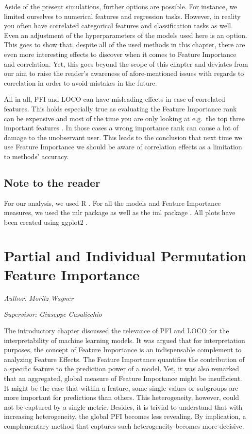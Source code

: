 \documentclass[]{krantz}
\begin{document}
Aside of the present simulations, further options are possible. For
instance, we limited ourselves to numerical features and regression
tasks. However, in reality you often have correlated categorical
features and classification tasks as well. Even an adjustment of the
hyperparameters of the models used here is an option. This goes to show
that, despite all of the used methods in this chapter, there are even
more interesting effects to discover when it comes to Feature Importance
and correlation. Yet, this goes beyond the scope of this chapter and
deviates from our aim to raise the reader's awareness of afore-mentioned
issues with regards to correlation in order to avoid mistakes in the
future.

All in all, PFI and LOCO can have misleading effects in case of
correlated features. This holds especially true as evaluating the
Feature Importance rank can be expensive and most of the time you are
only looking at e.g.~the top three important features
\citep{molnar2019}. In those cases a wrong importance rank can cause a
lot of damage to the unobservant user. This leads to the conclusion that
next time we use Feature Importance we should be aware of correlation
effects as a limitation to methods' accuracy.

\section{Note to the reader}\label{note-to-the-reader}

For our analysis, we used R \citep{R-base}. For all the models and
Feature Importance measures, we used the mlr package \citep{R-mlr} as
well as the iml package \citep{molnar2018iml}. All plots have been
created using ggplot2 \citep{R-ggplot2}.

\chapter{Partial and Individual Permutation Feature
Importance}\label{pfi-partial}

\emph{Author: Moritz Wagner}

\emph{Supervisor: Giuseppe Casalicchio}

The introductory chapter discussed the relevance of PFI and LOCO for the
interpretability of machine learning models. It was argued that for
interpretation purposes, the concept of Feature Importance is an
indispensable complement to analyzing Feature Effects. The Feature
Importance quantifies the contribution of a specific feature to the
prediction power of a model. Yet, it was also remarked that an
aggregated, global measure of Feature Importance might be insufficient.
It might be the case that within a feature, some single values or
subgroups are more important for predictions than others. This
heterogeneity, however, could not be captured by a single metric.
Besides, it is trivial to understand that with increasing heterogeneity,
the global PFI becomes less revealing. By implication, a complementary
method that captures such heterogeneity becomes more decisive.
\end{document}

